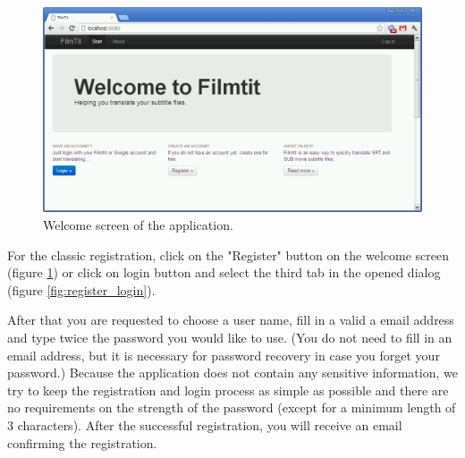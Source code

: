 \begin{figure}[h]
\begin{center}
\includegraphics[scale=0.4]{figures/user_manual/welcome_screen.png}
\end{center}
\caption{Welcome screen of the application.}
\label{fig:welcome}
\end{figure}

For the classic registration, click on the "Register" button on the welcome screen (figure \ref{fig:welcome}) or click on login button and select the third tab in the opened dialog (figure \ref{fig:register_login}).

After that you are requested to choose a user name, fill in a valid a email address and type twice the password you would like to use. (You do not need to fill in an email address, but it is necessary for password recovery in case you forget your password.) Because the application does not contain any sensitive information, we try to keep the registration and login process as simple as possible and there are no requirements on the strength of the password (except for a minimum length of 3 characters). After the successful registration, you will receive an email confirming the registration.

